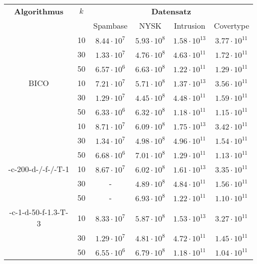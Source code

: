 \begin{table}[h]
\centering
\begin{tabular}{@{}cccccc@{}} \toprule
	\textbf{Algorithmus} & $k$ & \multicolumn{4}{c}{\textbf{Datensatz}} \\
	\cmidrule(r){3-6} & 		& Spambase 				& NYSK 				& Intrusion 			& Covertype \\ \toprule
	\Skmpp 						& 10 & $8.44 \cdot 10^7$ & $5.93 \cdot 10^8$ & $1.58 \cdot 10^{13}$ & $3.77 \cdot 10^{11}$ \\
		 						& 30 & $1.33 \cdot 10^7$ & $4.76 \cdot 10^8$ & $4.63 \cdot 10^{11}$ & $1.72 \cdot 10^{11}$ \\
		 						& 50 & $6.57 \cdot 10^6$ & $6.63 \cdot 10^8$ & $1.22 \cdot 10^{11}$ & $1.29 \cdot 10^{11}$ \\
	\midrule
	BICO 						& 10 & $7.21 \cdot 10^7$ & $5.71 \cdot 10^8$ & $1.37 \cdot 10^{13}$ & $3.56 \cdot 10^{11}$ \\
			 					& 30 & $1.29 \cdot 10^7$ & $4.45 \cdot 10^8$ & $4.48 \cdot 10^{11}$ & $1.59 \cdot 10^{11}$ \\
		 						& 50 & $6.33 \cdot 10^6$ & $6.32 \cdot 10^8$ & $1.18 \cdot 10^{11}$ & $1.15 \cdot 10^{11}$ \\
	\midrule
	\kmpp 						& 10 & $8.71 \cdot 10^7$ & $6.09 \cdot 10^8$ & $1.75 \cdot 10^{13}$ & $3.42 \cdot 10^{11}$ \\
			 					& 30 & $1.34 \cdot 10^7$ & $4.98 \cdot 10^8$ & $4.96 \cdot 10^{11}$ & $1.54 \cdot 10^{11}$ \\
		 						& 50 & $6.68 \cdot 10^6$ & $7.01 \cdot 10^8$ & $1.29 \cdot 10^{11}$ & $1.13 \cdot 10^{11}$ \\
	\midrule
	\KCsTwo-c-200-d-/-f-/-T-1	& 10 & $8.67 \cdot 10^7$ & $6.02 \cdot 10^8$ & $1.61 \cdot 10^{13}$ & $3.35 \cdot 10^{11}$ \\
			 					& 30 & - 				& $4.89 \cdot 10^8$ & $4.84 \cdot 10^{11}$ & $1.56 \cdot 10^{11}$ \\
		 						& 50 & - 				& $6.93 \cdot 10^8$	& $1.22 \cdot 10^{11}$ & $1.10 \cdot 10^{11}$ \\
	\midrule
	\KCsTwo-c-1-d-50-f-1.3-T-3	& 10 & $8.33 \cdot 10^7$ & $5.87 \cdot 10^8$ & $1.53 \cdot 10^{13}$ & $3.27 \cdot 10^{11}$ \\
			 					& 30 & $1.29 \cdot 10^7$ & $4.81 \cdot 10^8$ & $4.72 \cdot 10^{11}$ & $1.45 \cdot 10^{11}$ \\
		 						& 50 & $6.55 \cdot 10^6$ & $6.79 \cdot 10^8$ & $1.18 \cdot 10^{11}$ & $1.04 \cdot 10^{11}$ \\
	\midrule

\end{tabular}
\end{table}
